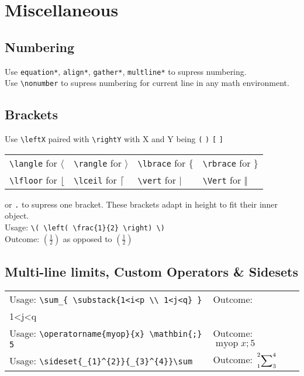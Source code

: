 \documentclass[draft]{../cheatsht/cheatsht}
\begin{document}
\section{Miscellaneous}
\subsection{Numbering}    %
Use \verb!equation*!, \verb!align*!, \verb!gather*!, \verb!multline*! to supress numbering.\\
Use \verb!\nonumber! to supress numbering for current line in
any math environment.

\subsection{Brackets}
Use \verb!\leftX! paired with \verb!\rightY! with X and Y being \verb!(!
\verb!)! \verb![! \verb!]!\\
\begin{tabular}{@{}llll@{}}
  \verb!\langle! for \(\langle\) & \verb!\rangle! for \(\rangle\) &
  \verb!\lbrace! for \(\lbrace\) & \verb!\rbrace! for  \(\rbrace\) \\
  \verb!\lfloor! for \(\lfloor\) & \verb!\lceil! for \(\lceil\) &
  \verb!\vert! for \(\vert\) & \verb!\Vert! for \(\Vert\)
\end{tabular}

or \verb!.! to supress one bracket. These brackets adapt in height to fit their
inner object.\\
Usage: \verb!\( \left( \frac{1}{2} \right) \)!\\
Outcome: \( \left( \frac{1}{2} \right) \) as opposed to \((\frac{1}{2})\)

\subsection{Multi-line limits, Custom Operators \& Sidesets}
\begin{tabular}{@{}ll@{}}
Usage: \verb!\sum_{ \substack{1<i<p \\ 1<j<q} }! &
  Outcome: \(\sum_{\substack{1<i<p\\1<j<q}}\) \\
Usage: \verb!\operatorname{myop}{x} \mathbin{;} 5! &
  Outcome: \(\operatorname{myop}{x} \mathbin{;} 5\)\\
Usage: \verb!\sideset{_{1}^{2}}{_{3}^{4}}\sum!&
  Outcome: \(\sideset{_{1}^{2}}{_{3}^{4}}\sum\)
\end{tabular}
\end{document}
